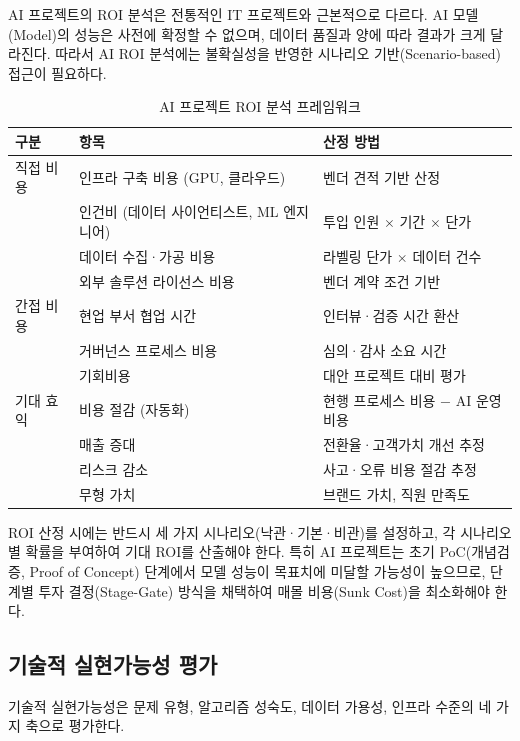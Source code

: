 AI 프로젝트의 ROI 분석은 전통적인 IT 프로젝트와 근본적으로 다르다. AI 모델(Model)의 성능은 사전에 확정할 수 없으며, 데이터 품질과 양에 따라 결과가 크게 달라진다. 따라서 AI ROI 분석에는 불확실성을 반영한 시나리오 기반(Scenario-based) 접근이 필요하다.

\begin{table}[htbp]
\centering
\caption{AI 프로젝트 ROI 분석 프레임워크}
\label{tab:roi_framework}
\begin{tabularx}{\textwidth}{p{2.5cm}Xp{4cm}}
\toprule
\textbf{구분} & \textbf{항목} & \textbf{산정 방법} \\
\midrule
직접 비용 & 인프라 구축 비용 (GPU, 클라우드) & 벤더 견적 기반 산정 \\
& 인건비 (데이터 사이언티스트, ML 엔지니어) & 투입 인원 $\times$ 기간 $\times$ 단가 \\
& 데이터 수집·가공 비용 & 라벨링 단가 $\times$ 데이터 건수 \\
& 외부 솔루션 라이선스 비용 & 벤더 계약 조건 기반 \\
\midrule
간접 비용 & 현업 부서 협업 시간 & 인터뷰·검증 시간 환산 \\
& 거버넌스 프로세스 비용 & 심의·감사 소요 시간 \\
& 기회비용 & 대안 프로젝트 대비 평가 \\
\midrule
기대 효익 & 비용 절감 (자동화) & 현행 프로세스 비용 $-$ AI 운영 비용 \\
& 매출 증대 & 전환율·고객가치 개선 추정 \\
& 리스크 감소 & 사고·오류 비용 절감 추정 \\
& 무형 가치 & 브랜드 가치, 직원 만족도 \\
\bottomrule
\end{tabularx}
\end{table}

ROI 산정 시에는 반드시 세 가지 시나리오(낙관·기본·비관)를 설정하고, 각 시나리오별 확률을 부여하여 기대 ROI를 산출해야 한다. 특히 AI 프로젝트는 초기 PoC(개념검증, Proof of Concept) 단계에서 모델 성능이 목표치에 미달할 가능성이 높으므로, 단계별 투자 결정(Stage-Gate) 방식을 채택하여 매몰 비용(Sunk Cost)을 최소화해야 한다.

\subsection{기술적 실현가능성 평가}
\label{sec:8.1.2}

기술적 실현가능성은 문제 유형, 알고리즘 성숙도, 데이터 가용성, 인프라 수준의 네 가지 축으로 평가한다.

